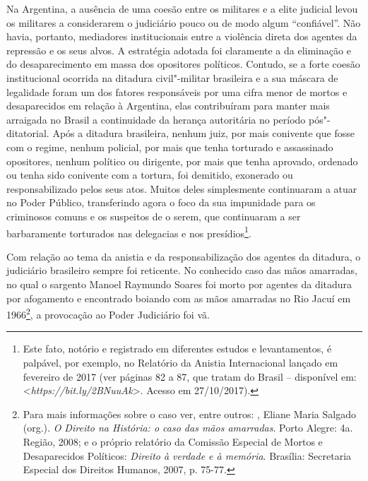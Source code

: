 Na Argentina, a ausência de uma coesão entre os militares e a elite
judicial levou os militares a considerarem o judiciário pouco ou de modo
algum ``confiável''. Não havia, portanto, mediadores institucionais
entre a violência direta dos agentes da repressão e os seus alvos. A
estratégia adotada foi claramente a da eliminação e do desaparecimento
em massa dos opositores políticos. Contudo, se a forte coesão
institucional ocorrida na ditadura civil"-militar brasileira e a sua
máscara de legalidade foram um dos fatores responsáveis por uma cifra
menor de mortos e desaparecidos em relação à Argentina, elas
contribuíram para manter mais arraigada no Brasil a continuidade da
herança autoritária no período pós"-ditatorial. Após a ditadura
brasileira, nenhum juiz, por mais conivente que fosse com o regime,
nenhum policial, por mais que tenha torturado e assassinado opositores,
nenhum político ou dirigente, por mais que tenha aprovado, ordenado ou
tenha sido conivente com a tortura, foi demitido, exonerado ou
responsabilizado pelos seus atos. Muitos deles simplesmente continuaram
a atuar no Poder Público, transferindo agora o foco da sua impunidade
para os criminosos comuns e os suspeitos de o serem, que continuaram a
ser barbaramente torturados nas delegacias e nos presídios\footnote{Este
  fato, notório e registrado em diferentes estudos e levantamentos, é
  palpável, por exemplo, no Relatório da Anistia Internacional lançado
  em fevereiro de 2017 (ver páginas 82 a 87, que tratam do Brasil --
  disponível em: \textless{}\emph{https://bit.ly/2BNuuAk}\textgreater{}.
  Acesso em 27/10/2017).}.

Com relação ao tema da anistia e da responsabilização dos agentes da
ditadura, o judiciário brasileiro sempre foi reticente. No conhecido
caso das mãos amarradas, no qual o sargento Manoel Raymundo Soares foi
morto por agentes da ditadura por afogamento e encontrado boiando com as
mãos amarradas no Rio Jacuí em 1966\footnote{Para mais informações sobre
  o caso ver, entre outros: , Eliane Maria Salgado (org.).
  \emph{O Direito na História: o caso das mãos amarradas}. Porto
  Alegre:  4a. Região, 2008; e o próprio relatório da Comissão
  Especial de Mortos e Desaparecidos Políticos: \emph{Direito à verdade e à memória}.
  Brasília: Secretaria Especial dos Direitos Humanos, 2007, p. 75-77.}, a
provocação ao Poder Judiciário foi vã.

